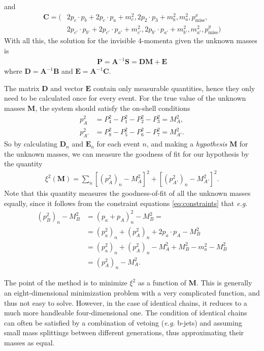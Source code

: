 \documentclass[twoside,english]{uiofysmaster}
\begin{document}
and
\begin{align}
	\mathbf{C} = ( &2p_c \cdot p_b + 2p_c \cdot p_a + m_c^2, 2 p_2 \cdot p_3 + m_b^2, m_a^2, p_\mathrm{miss}^x, \nonumber \\ 
				   &2p_{c'}\cdot p_{b'} + 2 p_{c'} \cdot p_{a'} + m_{c'}^2, 2 p_{b'} \cdot p_{a'} + m_{b'}^2, m_{a'}^2, p_\mathrm{miss}^y )
\end{align}
With all this, the solution for the invisible 4-momenta given the unknown masses is 
\begin{align}
	\mathbf{P} = \mathbf{A}^{-1} \mathbf{S} = \mathbf{D} \mathbf{M} + \mathbf{E}
\end{align}
where $\mathbf{D} = \mathbf{A}^{-1}\mathbf{B}$ and $\mathbf{E} = \mathbf{A}^{-1}\mathbf{C}$.

The matrix $\mathbf{D}$ and vector $\mathbf{E}$ contain only measurable quantities, hence they only need to be calculated once for every event. For the true value of the unknown masses $\mathbf{M}$, the system should satisfy the on-shell conditions
\begin{align}
	p_{A}^2 &= P_4^2 - P_1 ^2 - P_2^2 - P_3^2 = M_{A}^2, \nonumber\\
	p_{A'}^2 &= P_8^2 - P_5 ^2 - P_6^2 - P_7^2 = M_{A'}^2.
\end{align}
So by calculating $\mathbf{D}_n$ and $\mathbf{E}_n$ for each event $n$, and making a {\it hypothesis} $\mathbf{M}$ for the unknown masses, we can measure the goodness of fit for our hypothesis by the quantity
\begin{align}
	\xi^2(\mathbf{M}) = \sum_n \left[(p_{A}^2)_n - M_A^2\right]^2 + \left[(p_{A'}^2)_n - M_{A'}^2\right]^2. \label{eq:xisquared}
\end{align}
Note that this quantity measures the goodness-of-fit of all the unknown masses equally, since it follows from the constraint equations \eqref{eq:constraints} that {\it e.g.}
\begin{align}
	(p_B^2)_n - M_B^2 &= (p_a + p_A)_n^2 - M_B^2 = \nonumber\\
				  &= (p_a^2)_n + (p_A^2)_n + 2p_a\cdot p_A - M_B^2\nonumber\\
				  &= (p_a^2)_n + (p_A^2)_n - M_A^2 + M_B^2 - m_a^2 - M_B^2\\
				  &= (p_A^2)_n - M_A^2.\nonumber
\end{align}

The point of the method is to minimize $\xi^2$ as a function of $\mathbf{M}$. This is generally an eight-dimensional minimization problem with a very complicated function, and thus not easy to solve. However, in the case of identical chains, it reduces to a much more handleable four-dimensional one. The condition of identical chains can often be satisfied by a combination of vetoing ({\it e.g.} b-jets) and assuming small mass splittings between different generations, thus approximating their masses as equal. 
\end{document}
